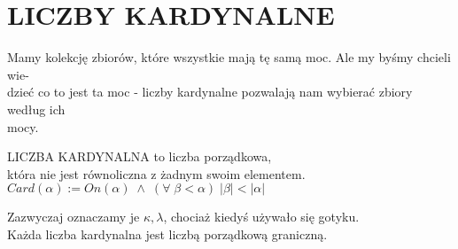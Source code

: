 \section{LICZBY KARDYNALNE}
Mamy kolekcję zbiorów, które wszystkie mają tę samą moc. Ale my byśmy chcieli wie-\\dzieć co to jest ta moc - liczby kardynalne pozwalają nam wybierać zbiory według ich \\mocy.\bigskip
\begin{center}\large
    {\color{def}LICZBA KARDYNALNA} to liczba porządkowa, \\która nie jest równoliczna z żadnym swoim elementem.\smallskip\\
    $Card(\alpha):=On(\alpha)\;\land\;(\forall\;\beta<\alpha)\;|\beta|<|\alpha|$
\end{center}\medskip
Zazwyczaj oznaczamy je $\kappa, \lambda$, chociaż kiedyś używało się gotyku.\bigskip\\
{\color{acc}Każda liczba kardynalna jest liczbą porządkową graniczną.}\medskip\\
